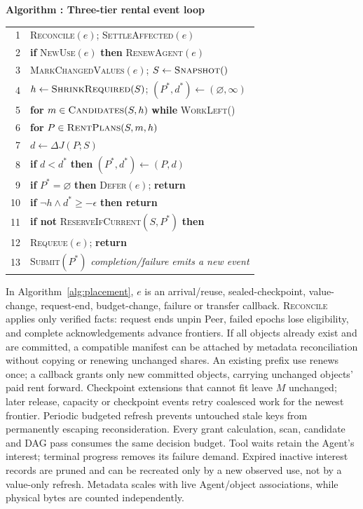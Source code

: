 \par\medskip\noindent\begin{minipage}{\columnwidth}
\raggedright
 \label{alg:placement}
 \textbf{Algorithm \thedesignalgorithm: Three-tier rental event loop}
 \par\smallskip
 \begin{tabularx}{\columnwidth}{@{}r@{\quad}X@{}}
 \toprule
 1 & \textsc{Reconcile}$(e)$; \textsc{SettleAffected}$(e)$ \\
 2 & \textbf{if} \textsc{NewUse}$(e)$ \textbf{then} \textsc{RenewAgent}$(e)$ \\
 3 & \textsc{MarkChangedValues}$(e)$; $S\gets\textsc{Snapshot}()$ \\
 4 & $h\gets\textsc{ShrinkRequired}(S)$; $(P^*,d^*)\gets(\varnothing,\infty)$ \\
 5 & \textbf{for} $m\in\textsc{Candidates}(S,h)$ \textbf{while} \textsc{WorkLeft}() \\
 6 & \quad \textbf{for} $P\in\textsc{RentPlans}(S,m,h)$ \\
 7 & \qquad $d\gets\Delta J(P;S)$ \\
 8 & \qquad \textbf{if} $d<d^*$ \textbf{then} $(P^*,d^*)\gets(P,d)$ \\
 9 & \textbf{if} $P^*=\varnothing$ \textbf{then} \textsc{Defer}$(e)$; \textbf{return} \\
 10 & \textbf{if} $\neg h\land d^*\ge-\epsilon$ \textbf{then return} \\
 11 & \textbf{if not} \textsc{ReserveIfCurrent}$(S,P^*)$ \textbf{then} \\
 12 & \quad \textsc{Requeue}$(e)$; \textbf{return} \\
 13 & \textsc{Submit}$(P^*)$ \quad\textit{completion/failure emits a new event} \\
 \bottomrule
 \end{tabularx}
\end{minipage}\par\medskip

In Algorithm~\ref{alg:placement}, $e$ is an arrival/reuse, sealed-checkpoint,
value-change, request-end, budget-change, failure or transfer callback.
\textsc{Reconcile} applies only verified facts: request ends unpin Peer,
failed epochs lose eligibility, and complete acknowledgements advance
frontiers. If all objects already exist and are committed, a compatible
manifest can be attached by metadata reconciliation without copying or
renewing unchanged shares. An existing prefix use renews once; a callback grants only
new committed objects, carrying unchanged objects' paid rent forward.
Checkpoint extensions that cannot fit leave $M$ unchanged; later release,
capacity or checkpoint events retry coalesced work for the newest frontier.
Periodic budgeted refresh prevents untouched stale keys from permanently
escaping reconsideration. Every grant calculation, scan, candidate and
DAG pass consumes the same decision budget. Tool waits retain the Agent's
interest; terminal progress removes its failure demand. Expired inactive
interest records are pruned and can be recreated only by a new observed
use, not by a value-only refresh. Metadata scales with live Agent/object
associations, while physical bytes are counted independently.

